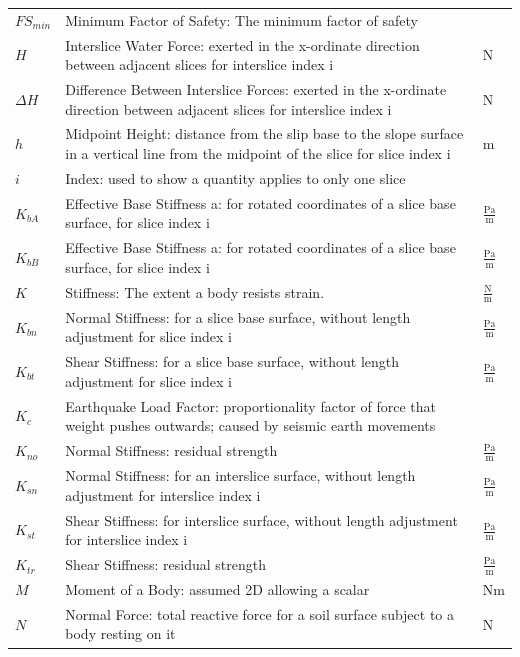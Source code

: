 \documentclass[12pt]{article}
\begin{document}
\begin{longtabu}{l X[l] l}
\\
${FS_{min}}$ & Minimum Factor of Safety: The minimum factor of safety & 
\\
$H$ & Interslice Water Force: exerted in the x-ordinate direction between adjacent slices for interslice index i & N
\\
$\Delta{}H$ & Difference Between Interslice Forces: exerted in the x-ordinate direction between adjacent slices for interslice index i & N
\\
$h$ & Midpoint Height: distance from the slip base to the slope surface in a vertical line from the midpoint of the slice for slice index i & m
\\
$i$ & Index: used to show a quantity applies to only one slice & 
\\
${K_{bA}}$ & Effective Base Stiffness a: for rotated coordinates of a slice base surface, for slice index i & $\frac{\text{Pa}}{\text{m}}$
\\
${K_{bB}}$ & Effective Base Stiffness a: for rotated coordinates of a slice base surface, for slice index i & $\frac{\text{Pa}}{\text{m}}$
\\
$K$ & Stiffness: The extent a body resists strain. & $\frac{\text{N}}{\text{m}}$
\\
${K_{bn}}$ & Normal Stiffness: for a slice base surface, without length adjustment for slice index i & $\frac{\text{Pa}}{\text{m}}$
\\
${K_{bt}}$ & Shear Stiffness: for a slice base surface, without length adjustment for slice index i & $\frac{\text{Pa}}{\text{m}}$
\\
${K_{c}}$ & Earthquake Load Factor: proportionality factor of force that weight pushes outwards; caused by seismic earth movements & 
\\
${K_{no}}$ & Normal Stiffness: residual strength & $\frac{\text{Pa}}{\text{m}}$
\\
${K_{sn}}$ & Normal Stiffness: for an interslice surface, without length adjustment for interslice index i & $\frac{\text{Pa}}{\text{m}}$
\\
${K_{st}}$ & Shear Stiffness: for interslice surface, without length adjustment for interslice index i & $\frac{\text{Pa}}{\text{m}}$
\\
${K_{tr}}$ & Shear Stiffness: residual strength & $\frac{\text{Pa}}{\text{m}}$
\\
$M$ & Moment of a Body: assumed 2D allowing a scalar & Nm
\\
$N$ & Normal Force: total reactive force for a soil surface subject to a body resting on it & N

\end{longtabu}
\end{document}
